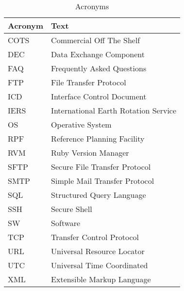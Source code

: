 \documentclass[dec_sum_main.tex]{subfiles}
\begin{document}
\begin{longtable}{|m{2.8cm}|m{10cm}|}
	\caption{Acronyms\label{long}} \\
    \hline
	\textbf{Acronym} & \textbf{Text} \\
	\hline
	COTS & Commercial Off The Shelf \\ \hline
	DEC & Data Exchange Component \\ \hline
	FAQ & Frequently Asked Questions \\ \hline
	FTP & File Transfer Protocol \\ \hline
	ICD & Interface Control Document \\ \hline
	IERS & International Earth Rotation Service \\ \hline
	OS & Operative System \\ \hline
	RPF & Reference Planning Facility \\ \hline
	RVM & Ruby Version Manager \\ \hline
	SFTP & Secure File Transfer Protocol \\ \hline
	SMTP & Simple Mail Transfer Protocol \\ \hline
	SQL & Structured Query Language \\ \hline
	SSH & Secure Shell \\ \hline
	SW & Software \\ \hline
	TCP & Transfer Control Protocol \\ \hline
	URL & Universal Resource Locator \\ \hline
	UTC & Universal Time Coordinated \\ \hline
	XML & Extensible Markup Language \\ \hline						
\end{longtable}
\end{document}
